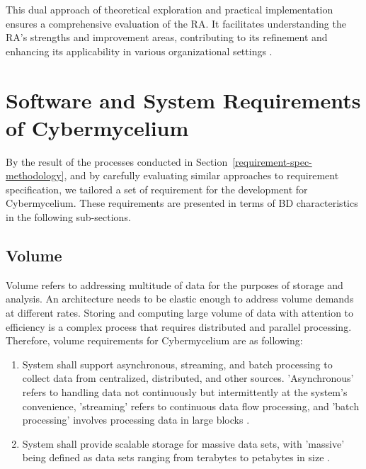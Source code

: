 \documentclass[review]{elsarticle}
\begin{document}
This dual approach of theoretical exploration and practical implementation ensures a comprehensive evaluation of the RA. It facilitates understanding the RA's strengths and improvement areas, contributing to its refinement and enhancing its applicability in various organizational settings \cite{sharpe2019industrial, rohling2019reference, Nakagawa}.



\section{Software and System Requirements of Cybermycelium} \label{requirements-section}

By the result of the processes conducted in Section~\ref{requirement-spec-methodology}, and by carefully evaluating similar approaches to requirement specification, we tailored a set of requirement for the development for Cybermycelium. These requirements are presented in terms of BD characteristics in the following sub-sections.


\subsection{Volume}

Volume refers to addressing multitude of data for the purposes of storage and analysis. An architecture needs to be elastic enough to address volume demands at different rates. Storing and computing large volume of data with attention to efficiency is a complex process that requires distributed and parallel processing. Therefore, volume requirements for Cybermycelium are as following:


\begin{enumerate}[label=\textbf{Vol-\arabic*}]
    \item System shall support asynchronous, streaming, and batch processing to collect data from centralized, distributed, and other sources. 'Asynchronous' refers to handling data not continuously but intermittently at the system's convenience, 'streaming' refers to continuous data flow processing, and 'batch processing' involves processing data in large blocks \cite{reis2022fundamentals}.
    \item System shall provide scalable storage for massive data sets, with 'massive' being defined as data sets ranging from terabytes to petabytes in size \cite{reis2022fundamentals}.
\end{enumerate}
\end{document}
